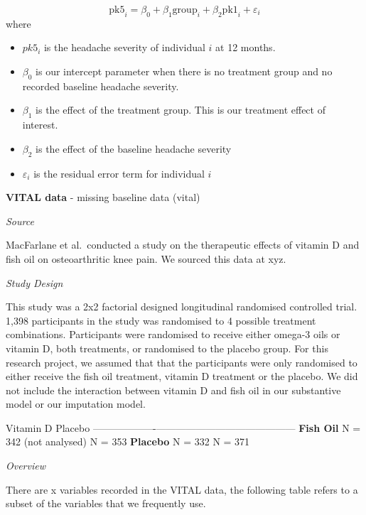 \documentclass{article}
\providecommand{\tightlist}{%
  \setlength{\itemsep}{0pt}\setlength{\parskip}{0pt}}
\begin{document}
\[\text{pk5}_i = \beta_0 + \beta_1 \text{group}_i + \beta_2 \text{pk1}_i + \varepsilon_i\]
where

\begin{itemize}
\tightlist
\item
  \(pk5_i\) is the headache severity of individual \(i\) at 12 months.
\item
  \(\beta_0\) is our intercept parameter when there is no treatment
  group and no recorded baseline headache severity.
\item
  \(\beta_1\) is the effect of the treatment group. This is our
  treatment effect of interest.
\item
  \(\beta_2\) is the effect of the baseline headache severity
\item
  \(\varepsilon_i\) is the residual error term for individual \(i\)
\end{itemize}

\textbf{VITAL data} - missing baseline data (vital)

\emph{Source}

MacFarlane et al.~conducted a study on the therapeutic effects of
vitamin D and fish oil on osteoarthritic knee pain. We sourced this data
at xyz.

\emph{Study Design}

This study was a 2x2 factorial designed longitudinal randomised
controlled trial. 1,398 participants in the study was randomised to 4
possible treatment combinations. Participants were randomised to receive
either omega-3 oils or vitamin D, both treatments, or randomised to the
placebo group. For this research project, we assumed that that the
participants were only randomised to either receive the fish oil
treatment, vitamin D treatment or the placebo. We did not include the
interaction between vitamin D and fish oil in our substantive model or
our imputation model.

\textbar{} \textbar{} Vitamin D \textbar{} Placebo \textbar{}
\textbar-------------------\textbar------------------------\textbar------------------\textbar{}
\textbar{} \textbf{Fish Oil} \textbar{} N = 342 (not analysed)
\textbar{} N = 353 \textbar{} \textbar{} \textbf{Placebo} \textbar{} N =
332 \textbar{} N = 371 \textbar{}

\emph{Overview}

There are x variables recorded in the VITAL data, the following table
refers to a subset of the variables that we frequently use.
\end{document}
